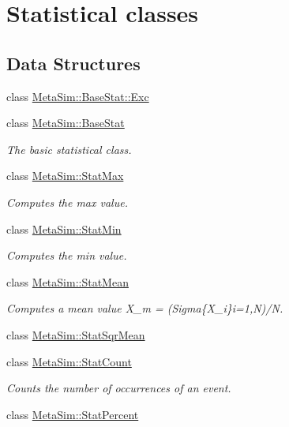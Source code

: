 \hypertarget{group__metasim__stat}{}\section{Statistical classes}
\label{group__metasim__stat}
\subsection*{Data Structures}
\begin{DoxyCompactItemize}
\item 
class \hyperlink{classMetaSim_1_1BaseStat_1_1Exc}{Meta\+Sim\+::\+Base\+Stat\+::\+Exc}
\item 
class \hyperlink{classMetaSim_1_1BaseStat}{Meta\+Sim\+::\+Base\+Stat}
\begin{DoxyCompactList}\small\item\em The basic statistical class. \end{DoxyCompactList}\item 
class \hyperlink{classMetaSim_1_1StatMax}{Meta\+Sim\+::\+Stat\+Max}
\begin{DoxyCompactList}\small\item\em Computes the max value. \end{DoxyCompactList}\item 
class \hyperlink{classMetaSim_1_1StatMin}{Meta\+Sim\+::\+Stat\+Min}
\begin{DoxyCompactList}\small\item\em Computes the min value. \end{DoxyCompactList}\item 
class \hyperlink{classMetaSim_1_1StatMean}{Meta\+Sim\+::\+Stat\+Mean}
\begin{DoxyCompactList}\small\item\em Computes a mean value X\+\_\+m = (Sigma\{X\+\_\+i\}i=1,N)/N. \end{DoxyCompactList}\item 
class \hyperlink{classMetaSim_1_1StatSqrMean}{Meta\+Sim\+::\+Stat\+Sqr\+Mean}
\item 
class \hyperlink{classMetaSim_1_1StatCount}{Meta\+Sim\+::\+Stat\+Count}
\begin{DoxyCompactList}\small\item\em Counts the number of occurrences of an event. \end{DoxyCompactList}\item 
class \hyperlink{classMetaSim_1_1StatPercent}{Meta\+Sim\+::\+Stat\+Percent}

\end{DoxyCompactItemize}
